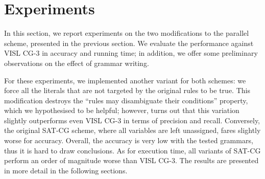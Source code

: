 






\section{Experiments}
\label{sec:eval}

In this section, we report experiments on the two modifications to the parallel scheme,
presented in the previous section. 
We evaluate the performance against VISL CG-3 in accuracy and running time; in addition, we offer some preliminary observations on the effect of grammar writing.

For these experiments, we implemented another variant for both schemes: 
we force all the literals that are not targeted by the original rules to be true.
This modification destroys the ``rules may disambiguate their conditions'' property, 
which we hypothesised to be helpful; however, turns out that this variation 
slightly outperforms even VISL CG-3 in terms of precision and recall.
Conversely, the original SAT-CG scheme, where all variables are left unassigned,
fares slightly worse for accuracy.
Overall, the accuracy is very low with the tested grammars, thus it is hard to draw conclusions.
As for execution time, all variants of SAT-CG perform an order of magnitude worse than VISL CG-3.
The results are presented in more detail in the following sections.


